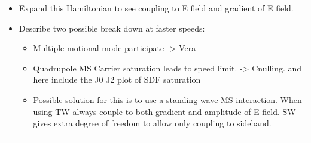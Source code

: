 \documentclass[12pt]{iopart}
\begin{document}
\begin{itemize}
\item Expand this Hamiltonian to see coupling to E field and gradient of E field.
\item Describe two possible break down at faster speeds:
    \begin{itemize}
    \item Multiple motional mode participate -> Vera
    \item Quadrupole MS Carrier saturation leads to speed limit. ->
        Cnulling. and here include the J0 J2 plot of SDF saturation
    \item Possible solution for this is to use a standing wave MS
  interaction. When using TW always couple to both gradient and
  amplitude of E field. SW gives extra degree of freedom to allow only
  coupling to sideband.
\end{itemize}
\end{itemize}

\hrule
\end{document}
